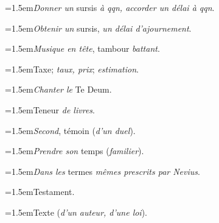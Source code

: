 \par{\dictfontsize\hangindent=1.5em\noindent \textit{Donner un} sursis \textit{à qqn, accorder un délai à qqn}. \par}
\par{\dictfontsize\hangindent=1.5em\noindent \textit{Obtenir un} sursis, \textit{un délai d’ajournement}. \par}
\par{\dictfontsize\hangindent=0pt\noindent{}\par}
\par{\dictfontsize\hangindent=1.5em\noindent \textit{Musique en tête}, tambour \textit{battant}. \par}
\par{\dictfontsize\hangindent=1.5em\noindent Taxe; \textit{taux, prix}; \textit{estimation}. \par}
\par{\dictfontsize\hangindent=1.5em\noindent \textit{Chanter le} Te Deum. \par}
\par{\dictfontsize\hangindent=1.5em\noindent Teneur \textit{de livres}. \par}
\par{\dictfontsize\hangindent=1.5em\noindent \textit{Second}, témoin (\textit{d’un duel}). \par}
\par{\dictfontsize\hangindent=1.5em\noindent \textit{Prendre son} temps (\textit{familier}). \par}
\par{\dictfontsize\hangindent=1.5em\noindent \textit{Dans les} termes \textit{mêmes prescrits par Nevius}. \par}
\par{\dictfontsize\hangindent=1.5em\noindent Testament. \par}
\par{\dictfontsize\hangindent=1.5em\noindent Texte (\textit{d’un auteur, d’une loi}). \par}
